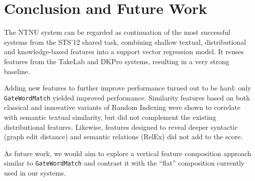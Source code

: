 \section{Conclusion and Future Work}


The NTNU system can be regarded as continuation of the most successful systems from the STS'12 shared task,  combining shallow textual, distributional and knowledge-based features into a support vector regression model. It reuses features from the TakeLab and DKPro systems, resulting in a very strong baseline. 

Adding new features to further improve performance turned out to be hard: 
only \texttt{GateWordMatch} yielded improved performance. 
Similarity features based on both classical and innovative variants of Random Indexing were shown to correlate with semantic textual similarity, but did not complement the existing distributional features. Likewise, features designed to reveal deeper syntactic (graph edit distance) and semantic relations (RelEx) did not add to the score. 

As future work, we would aim to explore a vertical feature composition approach similar 
to \texttt{GateWordMatch} and contrast it with the ``flat'' composition currently used in our systems. 